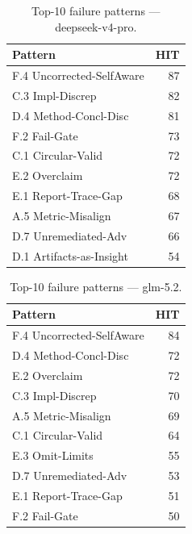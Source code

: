 \begin{table}[H]
\centering\small
\caption{Top-10 failure patterns --- deepseek-v4-pro.}
\label{tab:top10_dsk}
\begin{tabular}{@{}lr@{}}
\toprule
Pattern & HIT \\
\midrule
F.4 Uncorrected-SelfAware & 87 \\
C.3 Impl-Discrep          & 82 \\
D.4 Method-Concl-Disc     & 81 \\
F.2 Fail-Gate             & 73 \\
C.1 Circular-Valid        & 72 \\
E.2 Overclaim             & 72 \\
E.1 Report-Trace-Gap      & 68 \\
A.5 Metric-Misalign       & 67 \\
D.7 Unremediated-Adv      & 66 \\
D.1 Artifacts-as-Insight  & 54 \\
\bottomrule
\end{tabular}

\end{table}

\begin{table}[H]
\centering\small
\caption{Top-10 failure patterns --- glm-5.2.}
\label{tab:top10_glm}
\begin{tabular}{@{}lr@{}}
\toprule
Pattern & HIT \\
\midrule
F.4 Uncorrected-SelfAware & 84 \\
D.4 Method-Concl-Disc     & 72 \\
E.2 Overclaim             & 72 \\
C.3 Impl-Discrep          & 70 \\
A.5 Metric-Misalign       & 69 \\
C.1 Circular-Valid        & 64 \\
E.3 Omit-Limits           & 55 \\
D.7 Unremediated-Adv      & 53 \\
E.1 Report-Trace-Gap      & 51 \\
F.2 Fail-Gate             & 50 \\
\bottomrule
\end{tabular}

\end{table}

